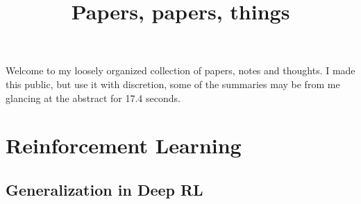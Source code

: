 

\title{Papers, papers, things}

Welcome to my loosely organized collection of papers, notes and thoughts. I made this public, but use it with discretion, some of the summaries may be from me glancing at the abstract for 17.4 seconds.

\donumbersections
\tableofcontents

\section{Reinforcement Learning}


\subsection{Generalization in Deep RL}
